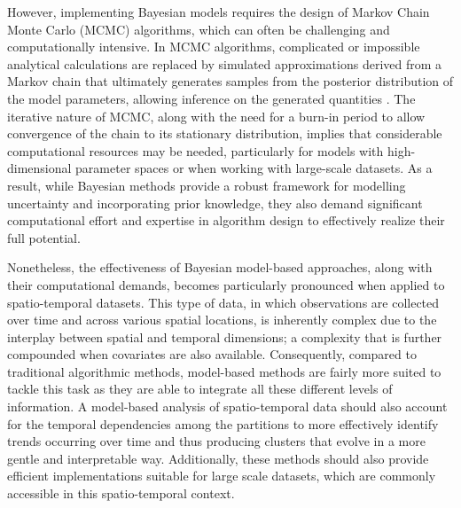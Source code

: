 \documentclass[12pt,	%
	a4paper,		%
	twoside,		%
	openright,		%
	titlepage,%
	]{book}
\theoremstyle{definition}
\let\cite\citep
\begin{document}
However, implementing Bayesian models requires the design of Markov Chain Monte Carlo (MCMC) algorithms, which can often be challenging and computationally intensive. In MCMC algorithms, complicated or impossible analytical calculations are replaced by simulated approximations \cite{paper-36} derived from a Markov chain that ultimately generates samples from the posterior distribution of the model parameters, allowing inference on the generated quantities \cite{gelman-bayesian} \cite{mcmcm-stat-methods}. The iterative nature of MCMC, along with the need for a burn-in period to allow convergence of the chain to its stationary distribution, implies that considerable computational resources may be needed, particularly for models with high-dimensional parameter spaces or when working with large-scale datasets. As a result, while Bayesian methods provide a robust framework for modelling uncertainty and incorporating prior knowledge, they also demand significant computational effort and expertise in algorithm design to effectively realize their full potential.

Nonetheless, the effectiveness of Bayesian model-based approaches, along with their computational demands, becomes particularly pronounced when applied to spatio-temporal datasets.
This type of data, in which observations are collected over time and across various spatial locations, is inherently complex due to the interplay between spatial and temporal dimensions; a complexity that is further compounded when covariates are also available.
Consequently, compared to traditional algorithmic methods, model-based methods are fairly more suited to tackle this task as they are able to integrate all these different levels of information. A model-based analysis of spatio-temporal data should also account for the temporal dependencies among the partitions to more effectively identify trends occurring over time and thus producing clusters that evolve in a more gentle and interpretable way. Additionally, these methods should also provide efficient implementations suitable for large scale datasets, which are commonly accessible in this spatio-temporal context.
\end{document}
